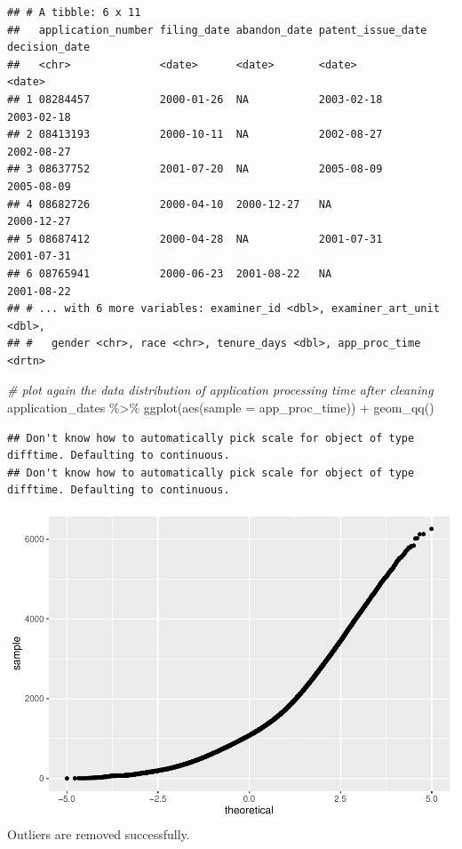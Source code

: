 \documentclass[
]{article}
\newenvironment{Shaded}{\begin{snugshade}}{\end{snugshade}}
\newcommand{\AttributeTok}[1]{\textcolor[rgb]{0.77,0.63,0.00}{#1}}
\newcommand{\CommentTok}[1]{\textcolor[rgb]{0.56,0.35,0.01}{\textit{#1}}}
\newcommand{\FunctionTok}[1]{\textcolor[rgb]{0.00,0.00,0.00}{#1}}
\newcommand{\NormalTok}[1]{#1}
\newcommand{\SpecialCharTok}[1]{\textcolor[rgb]{0.00,0.00,0.00}{#1}}
\begin{document}
\begin{verbatim}
## # A tibble: 6 x 11
##   application_number filing_date abandon_date patent_issue_date decision_date
##   <chr>              <date>      <date>       <date>            <date>       
## 1 08284457           2000-01-26  NA           2003-02-18        2003-02-18   
## 2 08413193           2000-10-11  NA           2002-08-27        2002-08-27   
## 3 08637752           2001-07-20  NA           2005-08-09        2005-08-09   
## 4 08682726           2000-04-10  2000-12-27   NA                2000-12-27   
## 5 08687412           2000-04-28  NA           2001-07-31        2001-07-31   
## 6 08765941           2000-06-23  2001-08-22   NA                2001-08-22   
## # ... with 6 more variables: examiner_id <dbl>, examiner_art_unit <dbl>,
## #   gender <chr>, race <chr>, tenure_days <dbl>, app_proc_time <drtn>
\end{verbatim}

\begin{Shaded}
\begin{Highlighting}[]
\CommentTok{\# plot again the data distribution of application processing time after cleaning}
\NormalTok{application\_dates }\SpecialCharTok{\%\textgreater{}\%}
  \FunctionTok{ggplot}\NormalTok{(}\FunctionTok{aes}\NormalTok{(}\AttributeTok{sample =}\NormalTok{ app\_proc\_time)) }\SpecialCharTok{+}
  \FunctionTok{geom\_qq}\NormalTok{()}
\end{Highlighting}
\end{Shaded}

\begin{verbatim}
## Don't know how to automatically pick scale for object of type difftime. Defaulting to continuous.
## Don't know how to automatically pick scale for object of type difftime. Defaulting to continuous.
\end{verbatim}

\includegraphics{final_report_files/figure-latex/unnamed-chunk-5-1.pdf}
Outliers are removed successfully.
\end{document}
